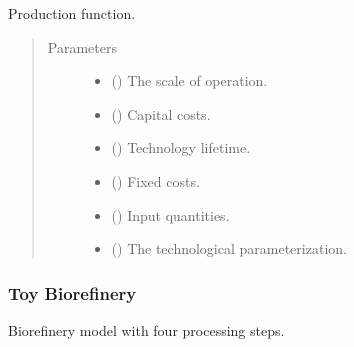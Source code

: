 \documentclass[letterpaper,10pt,english]{sphinxmanual}
\begin{document}

\begin{fulllineitems}
\label{\detokenize{technology:technology.simple_electrolysis.production}}
Production function.
\begin{quote}\begin{description}
\item[{Parameters}] \leavevmode\begin{itemize}
\item {} 
 () \textendash{} The scale of operation.

\item {} 
 () \textendash{} Capital costs.

\item {} 
 () \textendash{} Technology lifetime.

\item {} 
 () \textendash{} Fixed costs.

\item {} 
 () \textendash{} Input quantities.

\item {} 
 () \textendash{} The technological parameterization.

\end{itemize}

\end{description}\end{quote}

\end{fulllineitems}



\subsubsection{Toy Biorefinery}
\label{\detokenize{technology:module-technology.tutorial_biorefinery}}\label{\detokenize{technology:toy-biorefinery}}
Biorefinery model with four processing steps.
\end{document}
